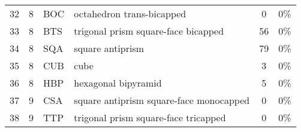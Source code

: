 \begin{tabular}{l l l l c c}
	32  & 8       & BOC   & octahedron trans-bicapped                                               & 0         & 0\%      \\
	33  & 8       & BTS   & trigonal prism square-face bicapped                                     & 56        & 0\%      \\
	34  & 8       & SQA   & square antiprism                                                        & 79        & 0\%      \\
	35  & 8       & CUB   & cube                                                                    & 3         & 0\%      \\
	36  & 8       & HBP   & hexagonal bipyramid                                                     & 5         & 0\%      \\
	37  & 9       & CSA   & square antiprism square-face monocapped                                 & 0         & 0\%      \\
	38  & 9       & TTP   & trigonal prism square-face tricapped                                    & 0         & 0\%	   \\
	\bottomrule
\end{tabular}
